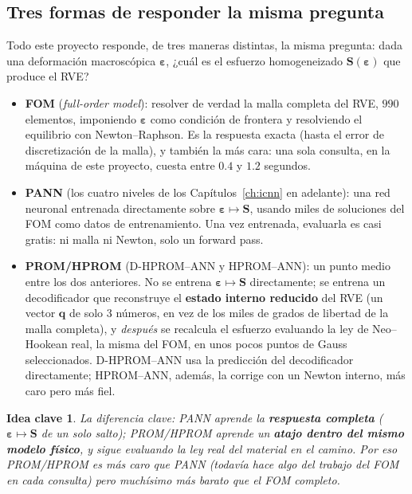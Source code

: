 \documentclass[11pt,a4paper]{article}
\newtheorem{takeaway}{Idea clave}
\begin{document}
\subsection{Tres formas de responder la misma pregunta}
\label{sec:appB-three-ways}

Todo este proyecto responde, de tres maneras distintas, la misma
pregunta: dada una deformaci\'on macrosc\'opica $\bm\varepsilon$,
¿cu\'al es el esfuerzo homogeneizado $\bm S(\bm\varepsilon)$ que produce
el RVE?

\begin{itemize}
\item \textbf{FOM} (\emph{full-order model}): resolver de verdad la
malla completa del RVE, $990$ elementos, imponiendo $\bm\varepsilon$
como condici\'on de frontera y resolviendo el equilibrio con
Newton--Raphson. Es la respuesta exacta (hasta el error de discretizaci\'on
de la malla), y tambi\'en la m\'as cara: una sola consulta, en la
m\'aquina de este proyecto, cuesta entre $0.4$ y $1.2$ segundos.
\item \textbf{PANN} (los cuatro niveles de los Cap\'itulos~\ref{ch:icnn}
en adelante): una red neuronal entrenada directamente sobre
$\bm\varepsilon\mapsto\bm S$, usando miles de soluciones del FOM como
datos de entrenamiento. Una vez entrenada, evaluarla es casi gratis: ni
malla ni Newton, solo un forward pass.
\item \textbf{PROM/HPROM} (D-HPROM--ANN y HPROM--ANN): un punto medio
entre los dos anteriores. No se entrena $\bm\varepsilon\mapsto\bm S$
directamente; se entrena un decodificador que reconstruye el
\textbf{estado interno reducido} del RVE (un vector $\bm q$ de solo $3$
n\'umeros, en vez de los miles de grados de libertad de la malla
completa), y \emph{despu\'es} se recalcula el esfuerzo evaluando la ley
de Neo--Hookean real, la misma del FOM, en unos pocos puntos de Gauss
seleccionados. D-HPROM--ANN usa la predicci\'on del decodificador
directamente; HPROM--ANN, adem\'as, la corrige con un Newton interno,
m\'as caro pero m\'as fiel.
\end{itemize}

\begin{takeaway}
La diferencia clave: PANN aprende la \textbf{respuesta completa}
($\bm\varepsilon\mapsto\bm S$ de un solo salto); PROM/HPROM aprende un
\textbf{atajo dentro del mismo modelo f\'isico}, y sigue evaluando la
ley real del material en el camino. Por eso PROM/HPROM es m\'as caro que
PANN (todav\'ia hace algo del trabajo del FOM en cada consulta) pero
much\'isimo m\'as barato que el FOM completo.
\end{takeaway}
\end{document}
